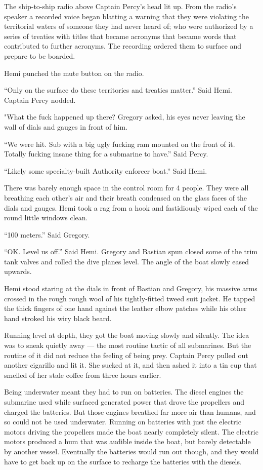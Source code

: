 \documentclass[]{article}
\begin{document}
The ship-to-ship radio above Captain Percy's head lit up. From the
radio's speaker a recorded voice began blatting a warning that they were
violating the territorial waters of someone they had never heard of; who
were authorized by a series of treaties with titles that became acronyms
that became words that contributed to further acronyms. The recording
ordered them to surface and prepare to be boarded.

Hemi punched the mute button on the radio.

``Only on the surface do these territories and treaties matter.'' Said
Hemi. Captain Percy nodded.

"What the fuck happened up there? Gregory asked, his eyes never leaving
the wall of dials and gauges in front of him.

``We were hit. Sub with a big ugly fucking ram mounted on the front of
it. Totally fucking insane thing for a submarine to have.'' Said Percy.

``Likely some specialty-built Authority enforcer boat.'' Said Hemi.

There was barely enough space in the control room for 4 people. They
were all breathing each other's air and their breath condensed on the
glass faces of the dials and gauges. Hemi took a rag from a hook and
fastidiously wiped each of the round little windows clean.

``100 meters.'' Said Gregory.

``OK. Level us off.'' Said Hemi. Gregory and Bastian spun closed some of
the trim tank valves and rolled the dive planes level. The angle of the
boat slowly eased upwards.

Hemi stood staring at the dials in front of Bastian and Gregory, his
massive arms crossed in the rough rough wool of his tightly-fitted tweed
suit jacket. He tapped the thick fingers of one hand against the leather
elbow patches while his other hand stroked his wiry black beard.

Running level at depth, they got the boat moving slowly and silently.
The idea was to sneak quietly away --- the most routine tactic of all
submarines. But the routine of it did not reduce the feeling of being
prey. Captain Percy pulled out another cigarillo and lit it. She sucked
at it, and then ashed it into a tin cup that smelled of her stale coffee
from three hours earlier.

Being underwater meant they had to run on batteries. The diesel engines
the submarine used while surfaced generated power that drove the
propellers and charged the batteries. But those engines breathed far
more air than humans, and so could not be used underwater. Running on
batteries with just the electric motors driving the propellers made the
boat nearly completely silent. The electric motors produced a hum that
was audible inside the boat, but barely detectable by another vessel.
Eventually the batteries would run out though, and they would have to
get back up on the surface to recharge the batteries with the diesels.
\end{document}
